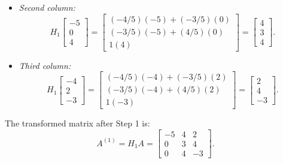 \begin{example}
\begin{enumerate}
\begin{itemize}
        \begin{align*}
            (-4/5)(4) + (-3/5)(3) &= -\frac{16+9}{5} = -5, \\
            (-3/5)(4) + (4/5)(3) &= -\frac{12}{5} + \frac{12}{5} = 0.
        \end{align*}
        \item \textit{Second column:}
        \begin{equation}
            H_1 \begin{bmatrix} -5 \\ 0 \\ 4 \end{bmatrix} = \begin{bmatrix} (-4/5)(-5) + (-3/5)(0) \\ (-3/5)(-5) + (4/5)(0) \\ 1(4) \end{bmatrix} = \begin{bmatrix} 4 \\ 3 \\ 4 \end{bmatrix}.
        \end{equation}
        \item \textit{Third column:}
        \begin{equation}
            H_1 \begin{bmatrix} -4 \\ 2 \\ -3 \end{bmatrix} = \begin{bmatrix} (-4/5)(-4) + (-3/5)(2) \\ (-3/5)(-4) + (4/5)(2) \\ 1(-3) \end{bmatrix} = \begin{bmatrix} 2 \\ 4 \\ -3 \end{bmatrix}.
        \end{equation}
    \end{itemize}
    The transformed matrix after Step 1 is:
    \begin{equation}
        A^{(1)} = H_1 A = \begin{bmatrix} 
        -5 & 4 & 2 \\ 
        0 & 3 & 4 \\ 
        0 & 4 & -3 
        \end{bmatrix}.
    \end{equation}
\end{enumerate}


\end{example}
